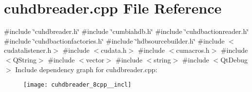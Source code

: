 \section{cuhdbreader.\+cpp File Reference}
\label{cuhdbreader_8cpp}
{\ttfamily \#include \char`\"{}cuhdbreader.\+h\char`\"{}}\newline
{\ttfamily \#include \char`\"{}cumbiahdb.\+h\char`\"{}}\newline
{\ttfamily \#include \char`\"{}cuhdbactionreader.\+h\char`\"{}}\newline
{\ttfamily \#include \char`\"{}cuhdbactionfactories.\+h\char`\"{}}\newline
{\ttfamily \#include \char`\"{}hdbsourcebuilder.\+h\char`\"{}}\newline
{\ttfamily \#include $<$cudatalistener.\+h$>$}\newline
{\ttfamily \#include $<$cudata.\+h$>$}\newline
{\ttfamily \#include $<$cumacros.\+h$>$}\newline
{\ttfamily \#include $<$Q\+String$>$}\newline
{\ttfamily \#include $<$vector$>$}\newline
{\ttfamily \#include $<$string$>$}\newline
{\ttfamily \#include $<$Qt\+Debug$>$}\newline
Include dependency graph for cuhdbreader.\+cpp\+:
\nopagebreak
\begin{figure}[H]
\begin{center}
\leavevmode
\texttt{[image: cuhdbreader\_8cpp\_\_incl]}
\end{center}
\end{figure}
